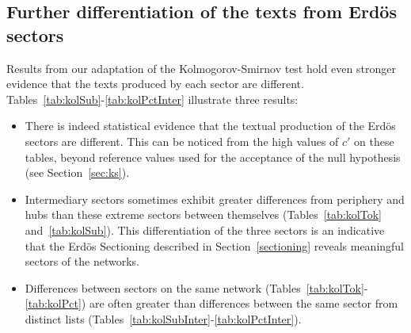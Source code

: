 
%
%
%
%
%
%
%
%
%
%
%
%
%





\subsection{Further differentiation of the texts from Erd\"os sectors}\label{subsec:di}








Results from our adaptation of the Kolmogorov-Smirnov test
hold even stronger evidence
that the texts produced by each sector are different.
Tables~\ref{tab:kolSub}-\ref{tab:kolPctInter}
illustrate three results:
\begin{itemize}
    \item There is indeed statistical evidence that the textual production of the Erd\"os sectors are different.
	    This can be noticed from the high values of $c'$ on these tables,
	    beyond reference values used for the acceptance of the 
	    null hypothesis (see Section~\ref{sec:ks}).
    \item Intermediary sectors sometimes exhibit greater differences 
from periphery and hubs than these extreme sectors between themselves 
(Tables~\ref{tab:kolTok} and~\ref{tab:kolSub}).
This differentiation of the three sectors is an
indicative that the Erd\"os Sectioning
described in Section~\ref{sectioning} reveals meaningful
sectors of the networks.
    \item Differences between sectors on the same network 
	    (Tables~\ref{tab:kolTok}-\ref{tab:kolPct}) are often greater than differences between the same sector from distinct lists (Tables~\ref{tab:kolSubInter}-\ref{tab:kolPctInter}).
\end{itemize}


